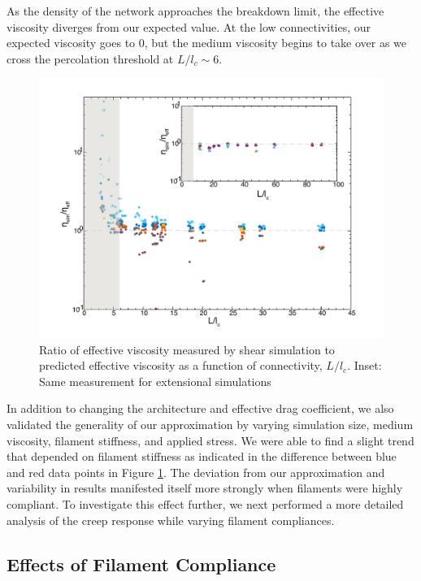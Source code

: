 As the density of the network approaches the breakdown limit, the effective viscosity diverges from our expected value.  At the low connectivities, our expected viscosity goes to 0, but the medium viscosity begins to take over as we cross the percolation threshold at $L/l_c \sim 6$.  
\begin{figure}[h!]
\centering
\includegraphics[width=\hsize]{slippage/eff_vic_master}
\caption{\label{fig:effvic}Ratio of effective viscosity measured by shear simulation to predicted effective viscosity as a function of connectivity, $L/l_c$. Inset: Same measurement for extensional simulations }
\end{figure}

In addition to changing the architecture and effective drag coefficient, we also validated the generality of our approximation by varying simulation size, medium viscosity, filament stiffness, and applied stress.  We were able to find a slight trend that depended on filament stiffness as indicated in the difference between blue and red data points in Figure \ref{fig:effvic}.  The deviation from our approximation and variability in results manifested itself more strongly when filaments were highly compliant.  To investigate this effect further, we next performed a more detailed analysis of the creep response while varying filament compliances.



\subsection{Effects of Filament Compliance}
\label{sec:compliant}


